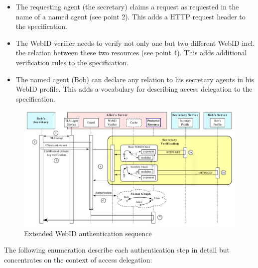 \documentclass[a4paper]{llncs}
\begin{document}
\begin{itemize}
    \item The requesting agent (the secretary) claims a request as requested in the name of a named agent (see point 2).
        This adds a HTTP request header to the specification.
    \item The WebID verifier needs to verify not only one but two different WebID incl. the relation between these two resources (see point 4).
        This adds additional verification rules to the specification.
    \item The named agent (Bob) can declare any relation to his secretary agents in his WebID profile.
        This adds a vocabulary for describing access delegation to the specification.
\end{itemize}

\begin{figure}[htb]
  \centering
  \includegraphics[width=\textwidth]{AuthSequence}
  \caption{Extended WebID authentication sequence}
  \label{fig:AuthSequence}
\end{figure}

The following enumeration describe each authentication step in detail but concentrates on the context of access delegation:
\end{document}
